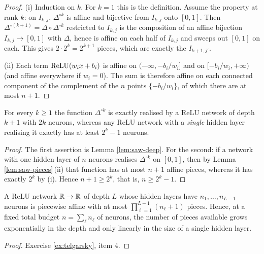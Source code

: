 \documentclass[11pt,a4paper]{article}
\begin{document}
\begin{proof}
(i) Induction on $k$. For $k=1$ this is the definition. Assume the property at rank $k$: on
$I_{k,j}$, $\Delta^{\circ k}$ is affine and bijective from $I_{k,j}$ onto $[0,1]$. Then
$\Delta^{\circ(k+1)} = \Delta \circ \Delta^{\circ k}$ restricted to $I_{k,j}$ is the composition of
an affine bijection $I_{k,j} \to [0,1]$ with $\Delta$, hence is affine on each half of $I_{k,j}$ and
sweeps out $[0,1]$ on each. This gives $2\cdot 2^k = 2^{k+1}$ pieces, which are exactly the
$I_{k+1,j'}$.

(ii) Each term $\operatorname{ReLU}(w_i x + b_i)$ is affine on $(-\infty, -b_i/w_i]$ and on
$[-b_i/w_i, +\infty)$ (and affine everywhere if $w_i = 0$). The sum is therefore affine on each
connected component of the complement of the $n$ points $\{-b_i/w_i\}$, of which there are at most
$n+1$.
\end{proof}

\begin{theorem}\label{th:telgarsky}
For every $k \ge 1$ the function $\Delta^{\circ k}$ is exactly realised by a ReLU network of depth
$k+1$ with $2k$ neurons, whereas any ReLU network with a \emph{single} hidden layer realising it
exactly has at least $2^k - 1$ neurons.
\end{theorem}

\begin{proof}
The first assertion is Lemma \ref{lem:saw-deep}. For the second: if a network with one hidden layer
of $n$ neurons realises $\Delta^{\circ k}$ on $[0,1]$, then by Lemma \ref{lem:saw-pieces}\,(ii) that
function has at most $n+1$ affine pieces, whereas it has exactly $2^k$ by (i). Hence
$n + 1 \ge 2^k$, that is, $n \ge 2^k - 1$.
\end{proof}

\begin{corollary}\label{cor:pieces}
A ReLU network $\mathbb{R} \to \mathbb{R}$ of depth $L$ whose hidden layers have $n_1,\dots,n_{L-1}$ neurons is
piecewise affine with at most $\prod_{\ell=1}^{L-1}(n_\ell + 1)$ pieces. Hence, at a fixed total
budget $n = \sum_\ell n_\ell$ of neurons, the number of pieces available grows exponentially in the
depth and only linearly in the size of a single hidden layer.
\end{corollary}

\begin{proof}
Exercise \ref{ex:telgarsky}, item 4.
\end{proof}
\end{document}
